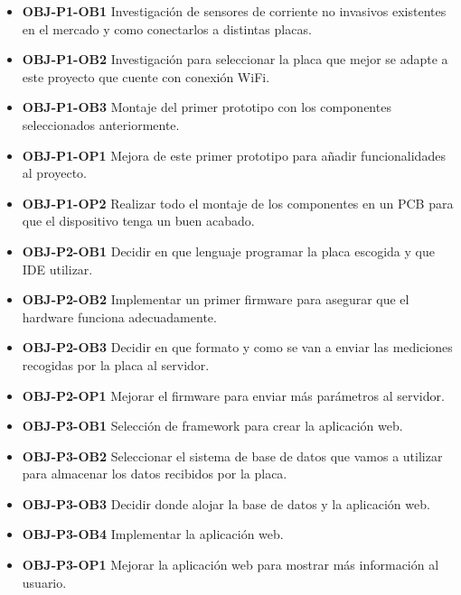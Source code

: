 \begin{itemize}
	\item\textbf{OBJ-P1-OB1} Investigación de sensores de corriente no invasivos existentes en el mercado y como conectarlos a distintas placas.
	
	\item\textbf{OBJ-P1-OB2} Investigación para seleccionar la placa que mejor se adapte a este proyecto que cuente con conexión WiFi.
		
	
	\item\textbf{OBJ-P1-OB3} Montaje del primer prototipo con los componentes seleccionados anteriormente.
	
	\item\textbf{OBJ-P1-OP1} Mejora de este primer prototipo para añadir funcionalidades al proyecto.
	
	\item\textbf{OBJ-P1-OP2} Realizar todo el montaje de los componentes en un PCB para que el dispositivo tenga un buen acabado.
	
	\item\textbf{OBJ-P2-OB1} Decidir en que lenguaje programar la placa escogida y que IDE utilizar.
	
	\item\textbf{OBJ-P2-OB2} Implementar un primer firmware para asegurar que el hardware funciona adecuadamente.
	
	\item\textbf{OBJ-P2-OB3} Decidir en que formato y como se van a enviar las mediciones recogidas por la placa al servidor.
	
	\item\textbf{OBJ-P2-OP1} Mejorar el firmware para enviar más parámetros al servidor.
	
	\item\textbf{OBJ-P3-OB1} Selección de framework para crear la aplicación web.
	
	\item\textbf{OBJ-P3-OB2} Seleccionar el sistema de base de datos que vamos a utilizar para almacenar los datos recibidos por la placa.
	
	\item\textbf{OBJ-P3-OB3} Decidir donde alojar la base de datos y la aplicación web.
	
	\item\textbf{OBJ-P3-OB4} Implementar la aplicación web.
	
	\item\textbf{OBJ-P3-OP1} Mejorar la aplicación web para mostrar más información al usuario.
	

\end{itemize}
